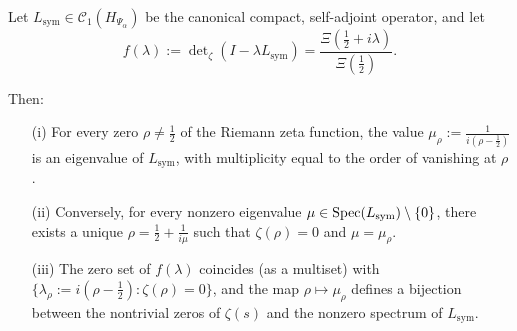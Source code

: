 \begin{lemma}
\label{lem:fredholm_zero_spectral_map}
Let \( L_{\mathrm{sym}} \in \mathcal{C}_1(H_{\Psi_\alpha}) \) be the canonical compact, self-adjoint operator, and let
\[
f(\lambda) := \det\nolimits_\zeta(I - \lambda L_{\mathrm{sym}})
= \frac{\Xi\left( \tfrac{1}{2} + i\lambda \right)}{\Xi\left( \tfrac{1}{2} \right)}.
\]

Then:
\begin{enumerate}
  \item[\textnormal{(i)}] For every zero \( \rho \ne \tfrac{1}{2} \) of the Riemann zeta function, the value \( \mu_\rho := \frac{1}{i(\rho - \tfrac{1}{2})} \) is an eigenvalue of \( L_{\mathrm{sym}} \), with multiplicity equal to the order of vanishing at \( \rho \).

  \item[\textnormal{(ii)}] Conversely, for every nonzero eigenvalue \( \mu \in \operatorname{Spec}(L_{\mathrm{sym}}) \setminus \{0\} \), there exists a unique \( \rho = \tfrac{1}{2} + \frac{1}{i\mu} \) such that \( \zeta(\rho) = 0 \) and \( \mu = \mu_\rho \).

  \item[\textnormal{(iii)}] The zero set of \( f(\lambda) \) coincides (as a multiset) with \( \{ \lambda_\rho := i(\rho - \tfrac{1}{2}) : \zeta(\rho) = 0 \} \), and the map \( \rho \mapsto \mu_\rho \) defines a bijection between the nontrivial zeros of \( \zeta(s) \) and the nonzero spectrum of \( L_{\mathrm{sym}} \).
\end{enumerate}
\end{lemma}
% 